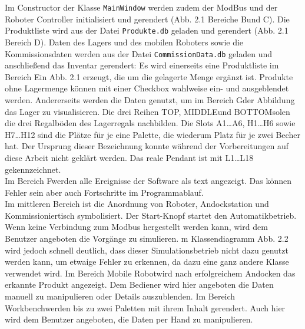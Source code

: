     Im Constructor der Klasse \verb|MainWindow| werden zudem der ModBus und der Roboter Controller initialisiert
    und gerendert (Abb. 2.1 Bereiche \glqq B\grqq und \glqq C\grqq).
    Die Produktliste wird aus der Datei \verb|Produkte.db| geladen und gerendert (Abb. 2.1 Bereich \glqq D\grqq).
    Daten des Lagers und des mobilen Roboters sowie die Kommissionsdaten werden aus der Datei \verb|CommissionData.db|
    geladen und anschließend das Inventar gerendert:
    Es wird einerseits eine Produktliste im Bereich \glqq E\grqq in Abb. 2.1 erzeugt, die um die gelagerte Menge ergänzt ist.
    Produkte ohne Lagermenge können mit einer Checkbox wahlweise ein- und ausgeblendet werden.
    Andererseits werden die Daten genutzt, um im Bereich \glqq G\grqq der Abbildung das Lager zu visualisieren.
    Die drei Reihen \glqq TOP\grqq, \glqq MIDDLE\grqq und \glqq BOTTOM\grqq solen die drei Regalböden des Lagerregals nachbilden.
    Die Slots A1\ldots A6, H1\ldots H6 sowie H7\ldots H12 sind die Plätze für je eine Palette, die wiederum Platz für
    je zwei Becher hat.
    Der Ursprung dieser Bezeichnung konnte während der Vorbereitungen auf diese Arbeit nicht geklärt werden.
    Das reale Pendant ist mit L1\ldots L18 gekennzeichnet.
    \\
    Im Bereich \glqq F\grqq werden alle Ereignisse der Software als text angezeigt.
    Das können Fehler sein aber auch Fortschritte im Programmablauf.
    \\
    Im mittleren Bereich ist die Anordnung von Roboter, Andockstation und Kommissioniertisch symbolisiert.
    Der \glqq Start\grqq -Knopf startet den Automatikbetrieb.
    Wenn keine Verbindung zum Modbus hergestellt werden kann, wird dem Benutzer angeboten die Vorgänge zu simulieren.
    m Klassendiagramm Abb. 2.2 wird jedoch schnell deutlich, dass dieser Simulationsbetrieb nicht dazu genutzt werden
    kann, um etwaige Fehler zu erkennen, da dazu eine ganz andere Klasse verwendet wird.
    Im Bereich \glqq Mobile Robot\grqq wird nach erfolgreichem Andocken das erkannte Produkt angezeigt.
    Dem Bediener wird hier angeboten die Daten manuell zu manipulieren oder Details auszublenden.
    Im Bereich \glqq Workbench\grqq werden bis zu zwei Paletten mit ihrem Inhalt gerendert.
    Auch hier wird dem Benutzer angeboten, die Daten per Hand zu manipulieren.


